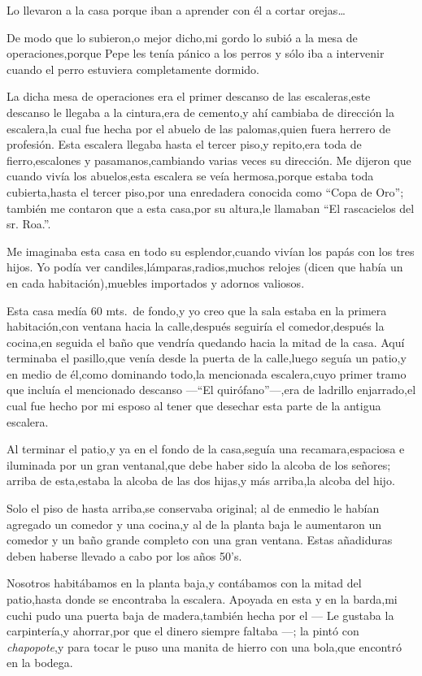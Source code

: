 \documentclass[letterpaper,12pt]{book}
\begin{document}
Lo llevaron a la casa porque iban a aprender con él a cortar orejas\ldots

De modo que lo subieron,o mejor dicho,mi gordo lo subió a la mesa de operaciones,porque Pepe les tenía pánico a los perros y sólo iba a intervenir cuando el perro estuviera completamente dormido.

La dicha mesa de operaciones era el primer descanso de las escaleras,este descanso le llegaba a la cintura,era de cemento,y ahí cambiaba de dirección la escalera,la cual fue hecha por el abuelo de las palomas,quien fuera herrero de profesión. Esta escalera llegaba hasta el tercer piso,y repito,era toda de fierro,escalones y pasamanos,cambiando varias veces su dirección. Me dijeron que cuando vivía los abuelos,esta escalera se veía hermosa,porque estaba toda cubierta,hasta el tercer piso,por una enredadera conocida como ``Copa de Oro''; también me contaron que a esta casa,por su altura,le llamaban ``El rascacielos del sr.  Roa.''. 

Me imaginaba  esta casa en todo su esplendor,cuando vivían los papás con los tres hijos. Yo podía ver candiles,lámparas,radios,muchos relojes (dicen que había un en cada habitación),muebles importados y adornos valiosos.

Esta casa medía 60 mts.\ de fondo,y yo creo que la sala estaba en la primera habitación,con ventana hacia la calle,después seguiría el comedor,después la cocina,en seguida el baño que vendría quedando hacia la mitad de la casa. Aquí terminaba el pasillo,que venía desde la puerta de la calle,luego seguía un patio,y en medio de él,como dominando todo,la mencionada escalera,cuyo primer tramo que incluía el mencionado descanso ---``El quirófano''---,era de ladrillo enjarrado,el cual fue hecho por mi esposo al tener que desechar esta parte de la antigua escalera.

Al terminar el patio,y ya en el fondo de la casa,seguía una recamara,espaciosa e iluminada por un gran ventanal,que debe haber sido la alcoba de los señores; arriba de esta,estaba la alcoba de las dos hijas,y más arriba,la alcoba del hijo.

Solo el piso de hasta arriba,se conservaba original; al de enmedio le habían agregado un comedor y una cocina,y al de la planta baja le aumentaron un comedor y un baño grande completo con una gran ventana. Estas añadiduras deben haberse llevado a cabo por los años 50's. 

Nosotros habitábamos en la planta baja,y contábamos con la mitad del patio,hasta donde se encontraba la escalera. Apoyada en esta y en la barda,mi cuchi pudo una puerta baja de madera,también hecha por el --- Le gustaba la carpintería,y ahorrar,por que el dinero siempre faltaba ---; la pintó con {\it chapopote},y para tocar le puso una manita de hierro con una bola,que encontró en la bodega.
\end{document}

